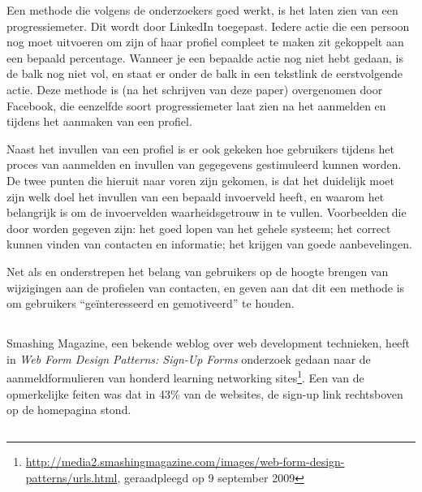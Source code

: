 \documentclass[a4paper, 10pt, pdftex]{report}
\begin{document}
    Een methode die volgens de onderzoekers goed werkt, is het laten zien van een progressiemeter. Dit wordt door LinkedIn toegepast. Iedere actie die een persoon nog moet uitvoeren om zijn of haar profiel compleet te maken zit gekoppelt aan een bepaald percentage. Wanneer je een bepaalde actie nog niet hebt gedaan, is de balk nog niet vol, en staat er onder de balk in een tekstlink de eerstvolgende actie. Deze methode is (na het schrijven van deze paper) overgenomen door Facebook, die eenzelfde soort progressiemeter laat zien na het aanmelden en tijdens het aanmaken van een profiel.

    Naast het invullen van een profiel is er ook gekeken hoe gebruikers tijdens het proces van aanmelden en invullen van gegegevens gestimuleerd kunnen worden. De twee punten die hieruit naar voren zijn gekomen, is dat het duidelijk moet zijn welk doel het invullen van een bepaald invoerveld heeft, en waarom het belangrijk is om de invoervelden waarheidsgetrouw in te vullen. Voorbeelden die door \citeauthor{Brouns2008} worden gegeven zijn: het goed lopen van het gehele systeem; het correct kunnen vinden van contacten en informatie; het krijgen van goede aanbevelingen.

    Net als \citet{Berlanga2007} en \citet{Sohn2005} onderstrepen \citeauthor{Brouns2008} het belang van gebruikers op de hoogte brengen van wijzigingen aan de profielen van contacten, en geven aan dat dit een methode is om gebruikers ``ge\"interesseerd en gemotiveerd'' te houden.

    \subsection{\cite{Editorial2008}}

    Smashing Magazine, een bekende weblog over web development technieken, heeft in \emph{Web Form Design Patterns: Sign-Up Forms} onderzoek gedaan naar de aanmeldformulieren van honderd learning networking sites\footnote{\url{http://media2.smashingmagazine.com/images/web-form-design-patterns/urls.html}, geraadpleegd op 9 september 2009}. Een van de opmerkelijke feiten was dat in 43\% van de websites, de sign-up link rechtsboven op de homepagina stond.

    \subsection{\cite{Sloep2009}}
\end{document}
